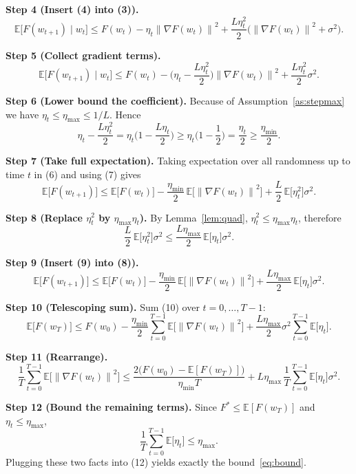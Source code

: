 \documentclass{article}
\newcommand{\E}{\mathbb{E}}
\newcommand{\norm}[1]{\left\|#1\right\|}
\begin{document}
\noindent\textbf{Step 4 (Insert (4) into (3)).}
\[
\E\!\big[F(w_{t+1})\mid w_{t}\big]
\le F(w_{t})-\eta_{t}\norm{\nabla F(w_{t})}^{2}
+\frac{L\eta_{t}^{2}}{2}\big(\norm{\nabla F(w_{t})}^{2}+\sigma^{2}\big).
\tag{5}
\]

\noindent\textbf{Step 5 (Collect gradient terms).}
\[
\E\!\big[F(w_{t+1})\mid w_{t}\big]
\le F(w_{t})-\Big(\eta_{t}-\frac{L\eta_{t}^{2}}{2}\Big)\norm{\nabla F(w_{t})}^{2}
+\frac{L\eta_{t}^{2}}{2}\sigma^{2}.
\tag{6}
\]

\noindent\textbf{Step 6 (Lower bound the coefficient).}  
Because of Assumption~\ref{as:stepmax} we have $\eta_{t}\le\eta_{\max}\le 1/L$. Hence
\[
\eta_{t}-\frac{L\eta_{t}^{2}}{2}
= \eta_{t}\Big(1-\frac{L\eta_{t}}{2}\Big)
\ge \eta_{t}\Big(1-\frac{1}{2}\Big)
= \frac{\eta_{t}}{2}
\ge \frac{\eta_{\min}}{2}.
\tag{7}
\]

\noindent\textbf{Step 7 (Take full expectation).}  
Taking expectation over all randomness up to time $t$ in (6) and using (7) gives
\[
\E\!\big[F(w_{t+1})\big]
\le \E\!\big[F(w_{t})\big]
-\frac{\eta_{\min}}{2}\,\E\!\big[\norm{\nabla F(w_{t})}^{2}\big]
+\frac{L}{2}\,\E\!\big[\eta_{t}^{2}\big]\sigma^{2}.
\tag{8}
\]

\noindent\textbf{Step 8 (Replace $\eta_{t}^{2}$ by $\eta_{\max}\eta_{t}$).}  
By Lemma~\ref{lem:quad}, $\eta_{t}^{2}\le\eta_{\max}\eta_{t}$, therefore
\[
\frac{L}{2}\,\E\!\big[\eta_{t}^{2}\big]\sigma^{2}
\le
\frac{L\eta_{\max}}{2}\,\E\!\big[\eta_{t}\big]\sigma^{2}.
\tag{9}
\]

\noindent\textbf{Step 9 (Insert (9) into (8)).}
\[
\E\!\big[F(w_{t+1})\big]
\le \E\!\big[F(w_{t})\big]
-\frac{\eta_{\min}}{2}\,\E\!\big[\norm{\nabla F(w_{t})}^{2}\big]
+\frac{L\eta_{\max}}{2}\,\E\!\big[\eta_{t}\big]\sigma^{2}.
\tag{10}
\]

\noindent\textbf{Step 10 (Telescoping sum).}  
Sum (10) over $t=0,\dots,T-1$:
\[
\E\!\big[F(w_{T})\big]
\le F(w_{0})
-\frac{\eta_{\min}}{2}\sum_{t=0}^{T-1}\E\!\big[\norm{\nabla F(w_{t})}^{2}\big]
+\frac{L\eta_{\max}}{2}\sigma^{2}\sum_{t=0}^{T-1}\E\!\big[\eta_{t}\big].
\tag{11}
\]

\noindent\textbf{Step 11 (Rearrange).}
\[
\frac{1}{T}\sum_{t=0}^{T-1}\E\!\big[\norm{\nabla F(w_{t})}^{2}\big]
\le
\frac{2\big(F(w_{0})-\E[F(w_{T})]\big)}{\eta_{\min}T}
+L\eta_{\max}\,\frac{1}{T}\sum_{t=0}^{T-1}\E\!\big[\eta_{t}\big]\sigma^{2}.
\tag{12}
\]

\noindent\textbf{Step 12 (Bound the remaining terms).}  
Since $F^{*}\le \E[F(w_{T})]$ and $\eta_{t}\le\eta_{\max}$,
\[
\frac{1}{T}\sum_{t=0}^{T-1}\E\!\big[\eta_{t}\big]\le\eta_{\max}.
\]
Plugging these two facts into (12) yields exactly the bound~\eqref{eq:bound}.
\end{document}
